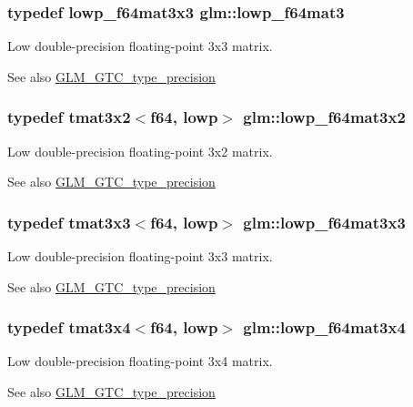 \subsubsection[{lowp\+\_\+f64mat3}]{\setlength{\rightskip}{0pt plus 5cm}typedef {\bf lowp\+\_\+f64mat3x3} {\bf glm\+::lowp\+\_\+f64mat3}}\label{namespaceglm_a4acbda53fb7ff9568c0a2786fad450b8}
Low double-\/precision floating-\/point 3x3 matrix. \begin{DoxySeeAlso}{See also}
\hyperlink{group__gtc__type__precision}{G\+L\+M\+\_\+\+G\+T\+C\+\_\+type\+\_\+precision} 
\end{DoxySeeAlso}
\hypertarget{namespaceglm_abf4affc88961615eb9a7f3fab56f27c7}{}
\subsubsection[{lowp\+\_\+f64mat3x2}]{\setlength{\rightskip}{0pt plus 5cm}typedef tmat3x2$<${\bf f64}, lowp$>$ {\bf glm\+::lowp\+\_\+f64mat3x2}}\label{namespaceglm_abf4affc88961615eb9a7f3fab56f27c7}
Low double-\/precision floating-\/point 3x2 matrix. \begin{DoxySeeAlso}{See also}
\hyperlink{group__gtc__type__precision}{G\+L\+M\+\_\+\+G\+T\+C\+\_\+type\+\_\+precision} 
\end{DoxySeeAlso}
\hypertarget{namespaceglm_a6367c3751539aea4009d60450f059189}{}
\subsubsection[{lowp\+\_\+f64mat3x3}]{\setlength{\rightskip}{0pt plus 5cm}typedef tmat3x3$<${\bf f64}, lowp$>$ {\bf glm\+::lowp\+\_\+f64mat3x3}}\label{namespaceglm_a6367c3751539aea4009d60450f059189}
Low double-\/precision floating-\/point 3x3 matrix. \begin{DoxySeeAlso}{See also}
\hyperlink{group__gtc__type__precision}{G\+L\+M\+\_\+\+G\+T\+C\+\_\+type\+\_\+precision} 
\end{DoxySeeAlso}
\hypertarget{namespaceglm_a741631f3eea564b862ca47d3e99b4481}{}
\subsubsection[{lowp\+\_\+f64mat3x4}]{\setlength{\rightskip}{0pt plus 5cm}typedef tmat3x4$<${\bf f64}, lowp$>$ {\bf glm\+::lowp\+\_\+f64mat3x4}}\label{namespaceglm_a741631f3eea564b862ca47d3e99b4481}
Low double-\/precision floating-\/point 3x4 matrix. \begin{DoxySeeAlso}{See also}
\hyperlink{group__gtc__type__precision}{G\+L\+M\+\_\+\+G\+T\+C\+\_\+type\+\_\+precision} 
\end{DoxySeeAlso}
\hypertarget{namespaceglm_a4378d9384f1b24848043ccb02dcf2959}{}
